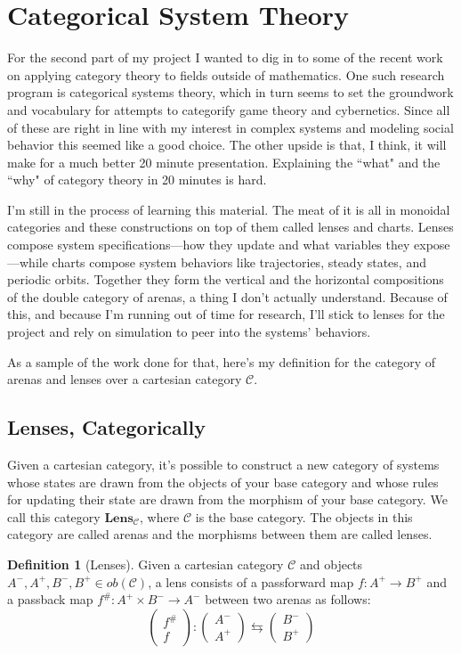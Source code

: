 \documentclass{article}
\theoremstyle{definition}
\newtheorem{definition}{Definition}
\begin{document}
\section*{Categorical System Theory}
For the second part of my project I wanted to dig in to some of the recent work on applying category theory to fields outside of mathematics.
One such research program is categorical systems theory, which in turn seems to set the groundwork and vocabulary for attempts to categorify game theory and cybernetics.
Since all of these are right in line with my interest in complex systems and modeling social behavior this seemed like a good choice.
The other upside is that, I think, it will make for a much better 20 minute presentation.
Explaining the ``what" and the ``why" of category theory in 20 minutes is hard.

I'm still in the process of learning this material.
The meat of it is all in monoidal categories and these constructions on top of them called lenses and charts.
Lenses compose system specifications---how they update and what variables they expose---while charts compose system behaviors like trajectories, steady states, and periodic orbits.
Together they form the vertical and the horizontal compositions of the double category of arenas, a thing I don't actually understand.
Because of this, and because I'm running out of time for research, I'll stick to lenses for the project and rely on simulation to peer into the systems' behaviors.

As a sample of the work done for that, here's my definition for the category of arenas and lenses over a cartesian category $\mathcal{C}$.

\subsection*{Lenses, Categorically}
Given a cartesian category, it's possible to construct a new category of systems whose states are drawn from the objects of your base category and whose rules for updating their state are drawn from the morphism of your base category.
We call this category $\textbf{Lens}_{\mathcal{C}}$, where $\mathcal{C}$ is the base category.
The objects in this category are called arenas and the morphisms between them are called lenses.

\begin{definition}[Lenses]
    Given a cartesian category $\mathcal{C}$ and objects $A^-, A^+, B^-, B^+ \in ob(\mathcal{C})$, a lens consists of a passforward map $f:A^+\rightarrow B^+$ and a passback map $f^\#:A^+ \times B^- \rightarrow A^-$ between two arenas as follows:
    \[
        \begin{pmatrix}f^{\#}\\f\end{pmatrix}:\begin{pmatrix}A^-\\A^+\end{pmatrix}\leftrightarrows\begin{pmatrix}B^-\\B^+\end{pmatrix}
    \]
\end{definition}
\end{document}
